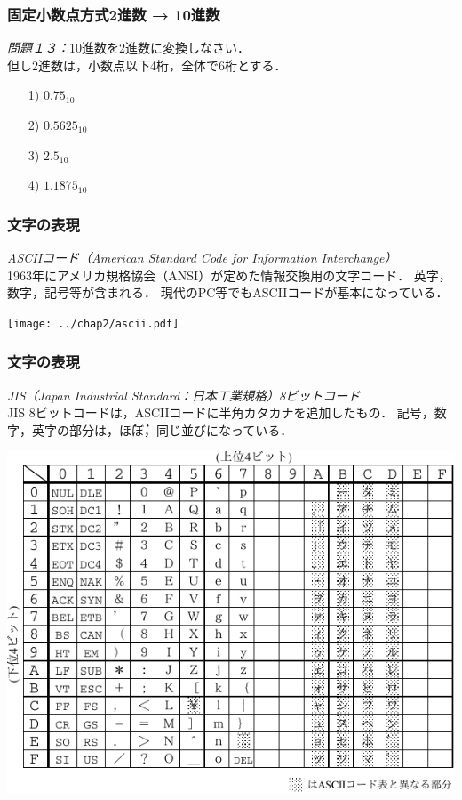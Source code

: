\documentclass{beamer}                 %
\begin{document}
\begin{frame}
  \frametitle{固定小数点方式2進数 →  10進数}
  \emph{問題１３：}10進数を2進数に変換しなさい．\\
       但し2進数は，小数点以下4桁，全体で6桁とする．
       \vfill
  \begin{enumerate}
  \item[1)] $0.75_{10}$
  \vfill
  \item[2)] $0.5625_{10}$
  \vfill
  \item[3)] $2.5_{10}$
  \vfill
  \item[4)] $1.1875_{10}$
  \end{enumerate}
\end{frame}

\begin{frame}
  \frametitle{文字の表現}
  \emph{ASCIIコード（American Standard Code for Information Interchange）}\\
  1963年にアメリカ規格協会（ANSI）が定めた情報交換用の文字コード．
  英字，数字，記号等が含まれる．
  現代のPC等でもASCIIコードが基本になっている．
  
  \texttt{[image: ../chap2/ascii.pdf]}

\end{frame}

\begin{frame}
  \frametitle{文字の表現}
  \emph{JIS（Japan Industrial Standard：日本工業規格）8ビットコード}\\
  JIS 8ビットコードは，ASCIIコードに半角カタカナを追加したもの．
  記号，数字，英字の部分は，\.ほ\.ぼ，同じ並びになっている．

  \includegraphics[scale=0.85]{../chap2/jisx0201.pdf}

\end{frame}
\end{document}
